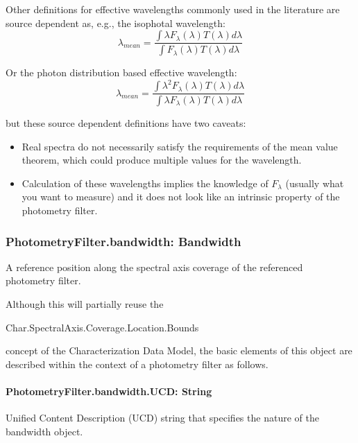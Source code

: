 \documentclass[11pt,a4paper]{ivoa}
\begin{document}
Other definitions for effective wavelengths commonly used in the literature
are source dependent as, e.g., the isophotal wavelength:
\begin{equation} \label{eq:19}
\lambda_{mean} = \frac{\int \lambda F_\lambda(\lambda)T(\lambda)d\lambda}{\int F_\lambda(\lambda)T(\lambda)d\lambda}
\end{equation}

Or the photon distribution based effective wavelength:
\begin{equation} \label{eq:20}
\lambda_{mean} = \frac{\int \lambda^2 F_\lambda(\lambda)T(\lambda)d\lambda}{\int \lambda F_\lambda(\lambda)T(\lambda)d\lambda}
\end{equation}

but these source dependent definitions have two caveats:

\begin{itemize}
	\item{Real spectra do not necessarily satisfy the requirements of the mean value theorem,
	which could produce multiple values for the wavelength.}

	\item{Calculation of these wavelengths implies the knowledge of $F_\lambda $ (usually
	what you want to measure) and it does not look like an intrinsic property of the
	photometry filter.}
\end{itemize}\par

\subsubsection{PhotometryFilter.bandwidth: Bandwidth}
A reference position along the spectral axis coverage of the referenced photometry filter.
\par

Although this will partially reuse the
\par

\begin{center}
Char.SpectralAxis.Coverage.Location.Bounds
\end{center}\par

\noindent concept of the Characterization Data Model,
the basic elements of this object are described
within the context of a photometry filter as follows.
\par

\paragraph{PhotometryFilter.bandwidth.UCD: String}
Unified Content Description (UCD) string that specifies the nature of the bandwidth object.
\par
\end{document}
